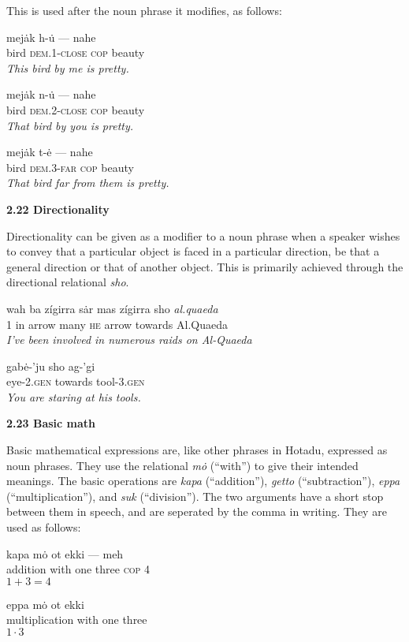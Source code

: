 \documentclass{article}[10pt]
\begin{document}
This is used after the noun phrase it modifies, as follows:
\begin{exe}
\ex
\gll mej\.{a}k h-\.{u} --- nahe\\
bird \textsc{dem.1}-\textsc{close} \textsc{cop} beauty\\
\trans \emph{This bird by me is pretty.}

\ex
\gll mej\.{a}k n-\.{u} --- nahe\\
bird \textsc{dem.2}-\textsc{close} \textsc{cop} beauty\\
\trans \emph{That bird by you is pretty.}

\ex
\gll mej\.{a}k t-\.{e} --- nahe\\
bird \textsc{dem.3}-\textsc{far} \textsc{cop} beauty\\
\trans \emph{That bird far from them is pretty.}
\end{exe}

{\bf 2.22 Directionality}

Directionality can be given as a modifier to a noun phrase when a speaker wishes to convey that a particular object is faced in a particular direction, be that a general direction or that of another object. This is primarily achieved through the directional relational \emph{sho}.

\begin{exe}
\ex
\gll wah ba z\'{i}girra s\.{a}r mas z\'{i}girra sho \emph{al.quaeda}\\
1 in arrow many \textsc{he} arrow towards Al.Quaeda\\
\trans \emph{I've been involved in numerous raids on Al-Quaeda}

\ex
\gll gab\.{e}-'ju sho ag-'gi\\
eye-\textsc{2.gen} towards tool-\textsc{3.gen}\\
\trans \emph{You are staring at his tools.}
\end{exe}

{\bf 2.23 Basic math}

Basic mathematical expressions are, like other phrases in Hotadu, expressed as noun phrases. They use the relational \emph{m\.{o}} (``with'') to give their intended meanings. The basic operations are \emph{kapa} (``addition''), \emph{getto} (``subtraction''), \emph{eppa} (``multiplication''), and \emph{suk} (``division''). The two arguments have a short stop between them in speech, and are seperated by the comma in writing. They are used as follows:

\begin{exe}
\ex
\gll kapa m\.{o} ot ekki --- meh\\
addition with one three \textsc{cop} 4\\
\trans \emph{$1 + 3 = 4$}

\ex
\gll eppa m\.{o} ot ekki\\
multiplication with one three\\
\trans \emph{$1 \cdot 3$}
\end{exe}
\end{document}
